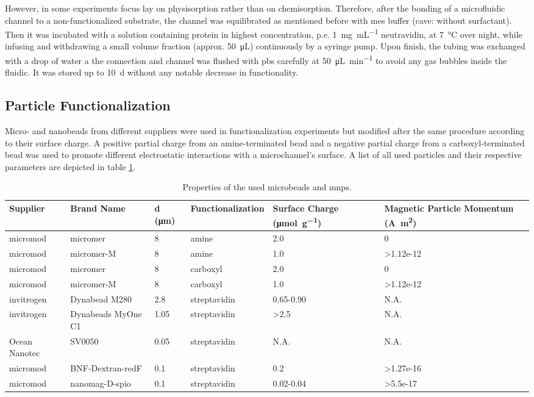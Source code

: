 However, in some experiments focus lay on physisorption rather than on chemisorption. Therefore, after the bonding of a microfluidic channel to a non-functionalized substrate, the channel was equilibrated as mentioned before with \gls{mes} buffer (cave: without surfactant). Then it was incubated with a solution containing protein in highest concentration, p.e. \SI{1}{\milli\gram\per\milli\liter} neutravidin, at \SI{7}{\degreeCelsius} over night, while infusing and withdrawing a small volume fraction (approx. \SI{50}{\micro\liter}) continuously by a syringe pump. Upon finish, the tubing was exchanged with a drop of water a the connection and channel was flushed with \gls{pbs} carefully at \SI{50}{\micro\liter\per\minute} to avoid any gas bubbles inside the fluidic. It was stored up to \SI{10}{\day} without any notable decrease in functionality.

\subsection{Particle Functionalization}
\label{sec:meth:particle}
Micro- and nanobeads from different suppliers were used in functionalization experiments but modified after the same procedure according to their surface charge. A positive partial charge from an \gls{amine}-terminated bead and a negative partial charge from a \gls{carboxyl}-terminated bead was used to promote different electrostatic interactions with a microchannel's surface. A list of all used particles and their respective parameters are depicted in table \ref{tab:particles}.
\begin{table}[htb]
	\normalsize
	\begin{tabularx}{\linewidth}{m{17mm}m{22mm}m{8mm}m{20mm}m{20mm}m{20mm}}
		\toprule[1pt]
		Supplier & Brand Name & d (\si{\micro\meter}) & Func\-tio\-na\-li\-za\-tion & Surface Charge (\si{\micro\mol\per\gram})  & Magnetic Particle Momentum (\si{\ampere\square\meter})\\
		\midrule
		micromod & micromer & \num{8} & \gls{amine} & \num{2.0} &  0 \\		
		micromod & micromer-M & \num{8} & \gls{amine}  & \num{1.0} & \num{>1.12e-12} \\ \addlinespace
		micromod & micromer & 8 & \gls{carboxyl} & \num{2.0} &  0\\
		micromod & micromer-M & 8 & \gls{carboxyl}  & \num{1.0} & \num{>1.12e-12}\\ \addlinespace
		invitrogen & Dynabead M280 & \num{2.8} & streptavidin & \num{.65}-\num{.90} &  N.A.\\
		invitrogen & Dynabeads MyOne C1 & \num{1.05} & streptavidin & \num{>2.5} & N.A. \\
		Ocean Nanotec &  SV0050  & \num{0.05}& streptavidin & N.A. & N.A. \\
		micromod & BNF-Dextran-redF &\num{0.1} & streptavidin &\num{0.2} & \num{>1.27e-16} \\
		micromod & nanomag-D-spio & \num{0.1} & streptavidin & \num{0.02}-\num{0.04} & \num{>5.5e-17} \\
		\bottomrule[1.2pt]
	\end{tabularx}
	\caption{Properties of the used microbeads and \glspl{mnp}.}
	\label{tab:particles}
\end{table}
